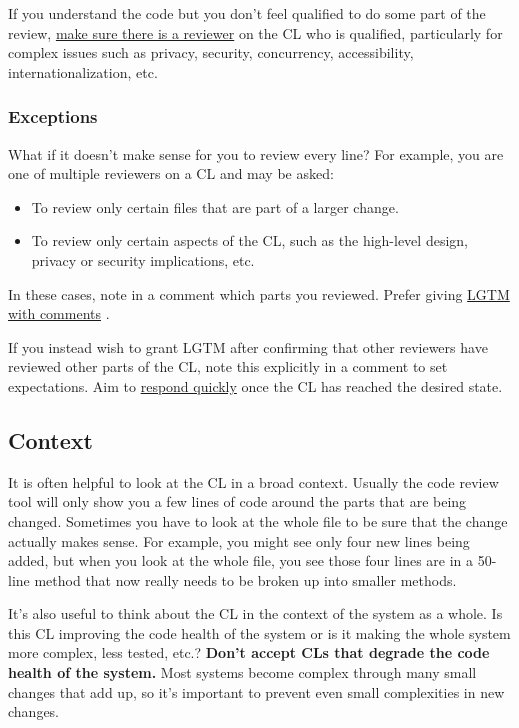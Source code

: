\documentclass[
]{article}
\providecommand{\tightlist}{%
  \setlength{\itemsep}{0pt}\setlength{\parskip}{0pt}}
\begin{document}
If you understand the code but you don't feel qualified to do some part
of the review, \hyperref[every-line-exceptions]{make sure there is a
reviewer} on the CL who is qualified, particularly for complex issues
such as privacy, security, concurrency, accessibility,
internationalization, etc.

\subsubsection{Exceptions}\label{every-line-exceptions}

What if it doesn't make sense for you to review every line? For example,
you are one of multiple reviewers on a CL and may be asked:

\begin{itemize}
\tightlist
\item
  To review only certain files that are part of a larger change.
\item
  To review only certain aspects of the CL, such as the high-level
  design, privacy or security implications, etc.
\end{itemize}

In these cases, note in a comment which parts you reviewed. Prefer
giving \href{speed.md\#lgtm-with-comments}{LGTM with comments} .

If you instead wish to grant LGTM after confirming that other reviewers
have reviewed other parts of the CL, note this explicitly in a comment
to set expectations. Aim to \href{speed.md\#responses}{respond quickly}
once the CL has reached the desired state.

\subsection{Context}\label{context}

It is often helpful to look at the CL in a broad context. Usually the
code review tool will only show you a few lines of code around the parts
that are being changed. Sometimes you have to look at the whole file to
be sure that the change actually makes sense. For example, you might see
only four new lines being added, but when you look at the whole file,
you see those four lines are in a 50-line method that now really needs
to be broken up into smaller methods.

It's also useful to think about the CL in the context of the system as a
whole. Is this CL improving the code health of the system or is it
making the whole system more complex, less tested, etc.? \textbf{Don't
accept CLs that degrade the code health of the system.} Most systems
become complex through many small changes that add up, so it's important
to prevent even small complexities in new changes.
\end{document}
